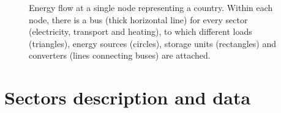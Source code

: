 \documentclass[3p]{elsarticle} %
\begin{document}
\begin{figure}[!t]
\begin{adjustbox}{scale=0.60,trim=5 6.8cm 0 0}
\begin{circuitikz}
  \end{circuitikz}

\end{adjustbox}
\caption{Energy flow at a single node representing a country. Within each node, there is a bus (thick horizontal line) for every sector 
(electricity, transport and heating), to which different loads (triangles), energy sources (circles), storage units (rectangles) and converters (lines connecting buses) are attached.}
\label{Fig_buses}
\end{figure}


\section{Sectors description and data}
\end{document}
